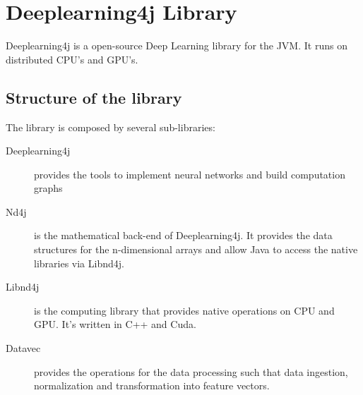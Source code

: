\chapter{Deeplearning4j Library}

Deeplearning4j is a open-source Deep Learning library for the {JVM}. It runs on distributed CPU's and GPU's.

\section{Structure of the library}
The library is composed by several sub-libraries:

\begin{description}
	\item [Deeplearning4j] provides the tools to implement neural networks and build computation graphs
	\item [Nd4j] is the mathematical back-end of Deeplearning4j. It provides the data structures for the n-dimensional arrays and allow Java to access the native libraries via Libnd4j.
	\item [Libnd4j] is the computing library that provides native operations on CPU and GPU. It's written in C++ and Cuda.
	\item [Datavec] provides the operations for the data processing such that data ingestion, normalization and transformation into feature vectors.
\end{description}